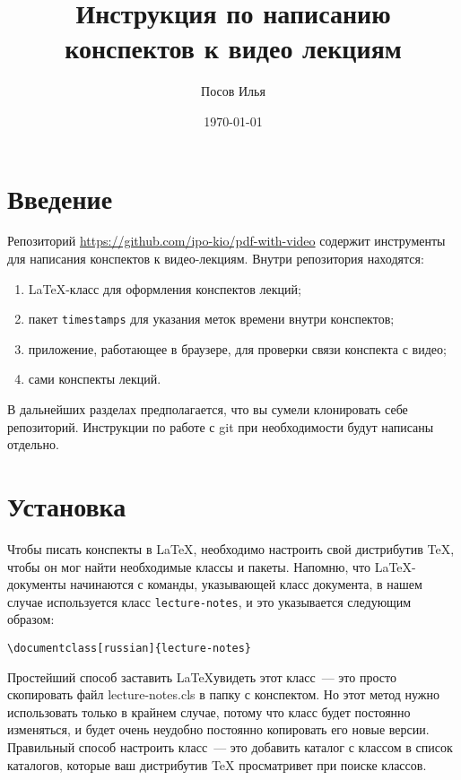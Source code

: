 \documentclass{article}
\title{Инструкция по написанию конспектов к видео лекциям}
\author{Посов Илья}
\date{\today}
\begin{document}
    \maketitle

    \section{Введение}
    Репозиторий \url{https://github.com/ipo-kio/pdf-with-video} содержит инструменты для написания конспектов к
    видео-лекциям.
    Внутри репозитория находятся:
    \begin{enumerate}
        \item \LaTeX-класс для оформления конспектов лекций;
        \item пакет \texttt{timestamps} для указания меток времени внутри конспектов;
        \item приложение, работающее в браузере, для проверки связи конспекта с видео;
        \item сами конспекты лекций.
    \end{enumerate}

    В дальнейших разделах предполагается, что вы сумели клонировать себе репозиторий.
    Инструкции по работе с git
    при необходимости будут написаны отдельно.


    \section{Установка}
    Чтобы писать конспекты в \LaTeX, необходимо настроить свой дистрибутив \TeX, чтобы он мог найти
    необходимые классы и пакеты.
    Напомню, что \LaTeX-документы начинаются с команды, указывающей класс документа, в нашем случае
    используется класс \texttt{lecture-notes}, и это указывается следующим образом:

    \begin{verbatim}\documentclass[russian]{lecture-notes}
    \end{verbatim}

    Простейший способ заставить \LaTeX увидеть этот класс~--- это просто скопировать файл lecture-notes.cls
    в папку с конспектом. Но этот метод нужно использовать только в крайнем случае, потому что класс будет
    постоянно изменяться, и будет очень неудобно постоянно копировать его новые версии. Правильный способ настроить
    класс~--- это добавить каталог с классом в список каталогов, которые ваш дистрибутив \TeX
    просматривет при поиске классов.
\end{document}
